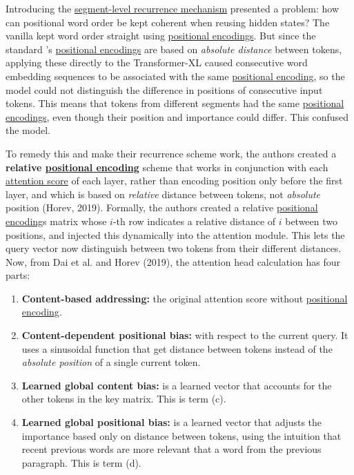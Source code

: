 Introducing the \hyperref[sec:SegmentLevelRec]{segment-level recurrence mechanism} presented a problem: how can positional word order be kept coherent when reusing hidden states? The vanilla  kept word order straight using \hyperref[sec:PosEncodings]{positional encodings}. But since the standard 's \hyperref[sec:PosEncodings]{positional encodings} are based on \emph{absolute distance} between tokens, applying these directly to the Transformer-XL caused consecutive word embedding sequences to be associated with the same \hyperref[sec:PosEncodings]{positional encoding}, so the model could not distinguish the difference in positions of consecutive input tokens. This means that tokens from different segments had the same \hyperref[sec:PosEncodings]{positional encodings}, even though their position and importance could differ. This confused the model. 

To remedy this and make their recurrence scheme work, the authors created a \textbf{relative \hyperref[sec:PosEncodings]{positional encoding}} scheme that works in conjunction with each \hyperref[sec:AttentionMechanism]{attention score} of each layer, rather than encoding position only before the first layer, and which is based on \emph{relative} distance between tokens, not \emph{absolute} position (Horev, 2019). Formally, the authors created a relative \hyperref[sec:PosEncodings]{positional encoding}s matrix whose $i$-th row indicates a relative distance of $i$ between two positions, and injected this dynamically into the attention module. This lets the query vector now distinguish between two tokens from their different distances. Now, from Dai et al. and Horev (2019), the attention head calculation has four parts: 
\begin{enumerate}
    \item \textbf{Content-based addressing: }the original attention score without \hyperref[sec:PosEncodings]{positional encoding}.
    
    \item \textbf{Content-dependent positional bias: }with respect to the current query. It uses a sinusoidal function that get distance between tokens instead of the \emph{absolute position} of a single current token. 
    
    \item \textbf{Learned global content bias: } is a learned vector that accounts for the other tokens in the key matrix. This is term (c).  
    
    \item \textbf{Learned global positional bias: }is a learned vector that adjusts the importance based only on distance between tokens, using the intuition that recent previous words are more relevant that a word from the previous paragraph. This is term (d). 
\end{enumerate}


